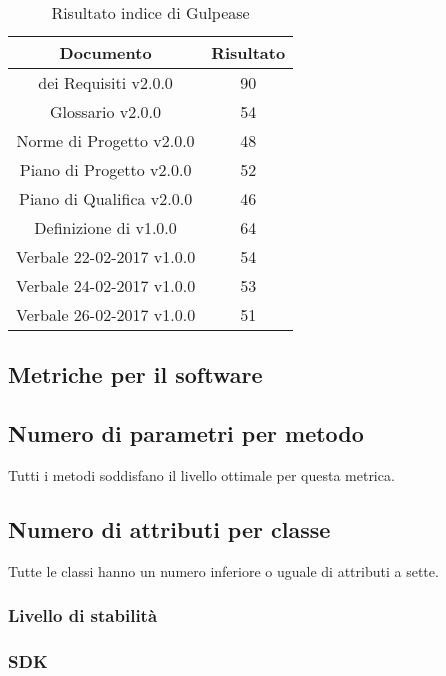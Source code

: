 \begin{table}[h]
	\begin{center}
		\begin{tabular}{|c|c|}
			\hline
			\textbf{Documento}	& \textbf{Risultato} \\
			\hline
		 \termine{Analisi} dei Requisiti v2.0.0 &	90\\
			\hline
			Glossario v2.0.0 &	54\\
			\hline
			Norme di Progetto v2.0.0 &	48\\
			\hline
			Piano di Progetto v2.0.0	&	52\\
			\hline
			Piano di Qualifica v2.0.0	&	46\\
			\hline
			Definizione di \termine{Prodotto} v1.0.0	&	64\\
			\hline
			Verbale 22-02-2017 v1.0.0	&	54\\
			\hline
			Verbale 24-02-2017 v1.0.0	&	53\\
			\hline
			Verbale 26-02-2017 v1.0.0	&	51\\
			\hline
		\end{tabular}
	\end{center}
	\caption{Risultato indice di Gulpease}
\end{table}

\subsection{Metriche per il software}

\subsection{Numero di parametri per metodo}

Tutti i metodi soddisfano il livello ottimale per questa metrica.

\subsection{Numero di attributi per classe}

Tutte le classi hanno un numero inferiore o uguale di attributi a sette.

\subsubsection{Livello di stabilità}

\subsubsection{SDK}

